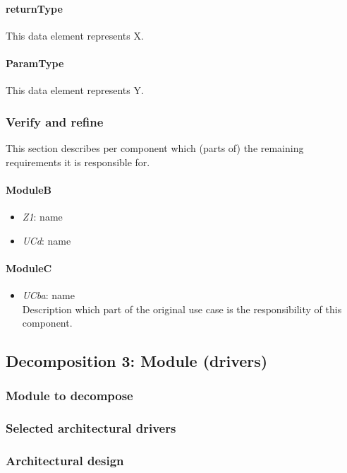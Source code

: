 \documentclass[a4paper,10pt]{article}
\begin{document}
\paragraph{returnType} This data element represents X.

\paragraph{ParamType} This data element represents Y.

\subsubsection{Verify and refine}
This section describes per component which (parts of) the remaining
requirements it is responsible for.

\paragraph{ModuleB}
\begin{itemize}
    \item \emph{Z1}: name
    \item \emph{UCd}: name
\end{itemize}

\paragraph{ModuleC}
\begin{itemize}
    \item \emph{UCba}: name\\Description which part of the original use case is
        the responsibility of this component.
\end{itemize}

\subsection{Decomposition 3: Module (drivers)}
\subsubsection{Module to decompose}
\subsubsection{Selected architectural drivers}
\subsubsection{Architectural design}
\end{document}

